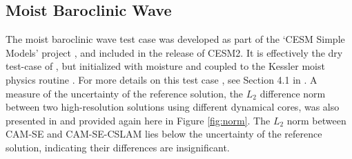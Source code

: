 \documentclass[twocol]{ametsoc}
\begin{document}
\subsection{{\color{red}Moist Baroclinic Wave{}}}

{\color{red}The moist baroclinic wave test case was developed as part of the `CESM Simple Models' project \citep{CESM_SIMPLER_MODELS}, and included in the release of CESM2. It is effectively the dry test-case of \cite{UMJS2014QJRMS}, but initialized with moisture and coupled to the Kessler moist physics routine \citep{K1969MM}. For more details on this test case \cite[which was part of the 2016 Dynamical Core Model Intercomparison Project, see ][]{DCMIP16}, see Section 4.1 in \cite{LetAl2018JAMES}. A measure of the uncertainty of the reference solution, the $L_2$ difference norm between two high-resolution solutions using different dynamical cores, was also presented in \cite{LetAl2018JAMES} and provided again here in Figure \ref{fig:norm}. The $L_2$ norm between CAM-SE and CAM-SE-CSLAM lies below the uncertainty of the reference solution, indicating their differences are insignificant.}
\end{document}
